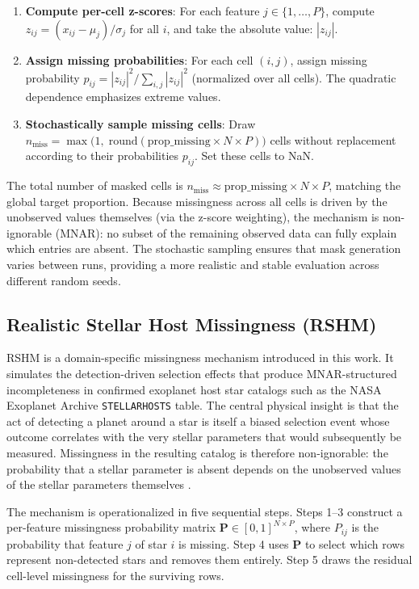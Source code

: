 \documentclass[preprint]{aastex631}
\begin{document}
\begin{enumerate}
  \item \textbf{Compute per-cell z-scores}: For each feature $j \in \{1, \ldots, P\}$, compute $z_{ij} = (x_{ij} - \mu_j) / \sigma_j$ for all $i$, and take the absolute value: $|z_{ij}|$.
  \item \textbf{Assign missing probabilities}: For each cell $(i,j)$, assign missing probability $p_{ij} = |z_{ij}|^2 / \sum_{i,j} |z_{ij}|^2$ (normalized over all cells). The quadratic dependence emphasizes extreme values.
  \item \textbf{Stochastically sample missing cells}: Draw $n_{\text{miss}} = \max\bigl(1,\; \text{round}(\text{prop\_missing} \times N \times P)\bigr)$ cells without replacement according to their probabilities $p_{ij}$. Set these cells to NaN.
\end{enumerate}

The total number of masked cells is $n_{\text{miss}} \approx \text{prop\_missing} \times N \times P$, matching the global target proportion. Because missingness across all cells is driven by the unobserved values themselves (via the z-score weighting), the mechanism is non-ignorable (MNAR): no subset of the remaining observed data can fully explain which entries are absent. The stochastic sampling ensures that mask generation varies between runs, providing a more realistic and stable evaluation across different random seeds.

\subsection{Realistic Stellar Host Missingness (RSHM)}
\label{sec:rshm}

RSHM is a domain-specific missingness mechanism introduced in this work. It simulates the detection-driven selection effects that produce MNAR-structured incompleteness in confirmed exoplanet host star catalogs such as the NASA Exoplanet Archive \texttt{STELLARHOSTS} table. The central physical insight is that the act of detecting a planet around a star is itself a biased selection event whose outcome correlates with the very stellar parameters that would subsequently be measured. Missingness in the resulting catalog is therefore non-ignorable: the probability that a stellar parameter is absent depends on the unobserved values of the stellar parameters themselves \citep{hsuOccurrenceRatesPlanets2019}.

The mechanism is operationalized in five sequential steps. Steps 1--3 construct a per-feature missingness probability matrix $\mathbf{P} \in [0,1]^{N \times P}$, where $P_{ij}$ is the probability that feature $j$ of star $i$ is missing. Step 4 uses $\mathbf{P}$ to select which rows represent non-detected stars and removes them entirely. Step 5 draws the residual cell-level missingness for the surviving rows.
\end{document}

